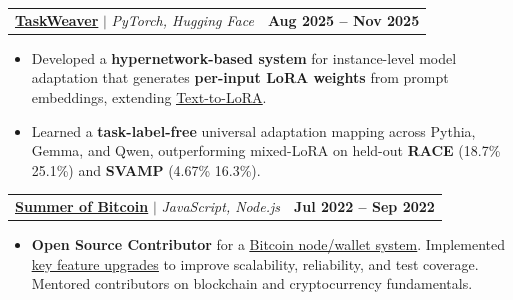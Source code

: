 \documentclass[letterpaper,10pt]{article}
\makeatletter
\newcommand{\resumeBulletItem}[1]{
  \item\small{
    {#1 \vspace{-2pt}}
  }
}
\newcommand{\resumeProjectHeading}[2]{
    \item
    \begin{tabular*}{1.0001\textwidth}{l@{\extracolsep{\fill}}r}
      \small#1 & \textbf{\small #2}\\
    \end{tabular*}\vspace{-7pt}
}
\newcommand{\resumeItemListStart}{\begin{itemize}}
\newcommand{\resumeItemListEnd}{\end{itemize}\vspace{-5pt}}
\makeatother
\begin{document}
    \vspace{-12pt}

    \resumeProjectHeading
    {\textbf{\href{https://github.com/RajWorking/taskweaver}{TaskWeaver}} $|$ \emph{PyTorch, Hugging Face}}{Aug 2025 -- Nov 2025}
        \resumeItemListStart
            \resumeBulletItem{
                Developed a \textbf{hypernetwork-based system} for instance-level model adaptation that generates \textbf{per-input LoRA weights} from prompt embeddings, extending \href{https://github.com/SakanaAI/text-to-lora}{\underline{Text-to-LoRA}}.
            }
            \resumeBulletItem{
                Learned a \textbf{task-label-free} universal adaptation mapping across Pythia, Gemma, and Qwen, outperforming mixed-LoRA on held-out \textbf{RACE} (18.7\% \textrightarrow{} 25.1\%) and \textbf{SVAMP} (4.67\% \textrightarrow{} 16.3\%).
            }
        \resumeItemListEnd
    


    \vspace{-12pt}

   \resumeProjectHeading
    {\textbf{\href{https://summerofbitcoin.org/}{Summer of Bitcoin}} $|$ \emph{JavaScript, Node.js}}{Jul 2022 -- Sep 2022}
    \resumeItemListStart
        \resumeBulletItem{
            \textbf{Open Source Contributor} for a \href{https://bcoin.io/}{\underline{Bitcoin node/wallet system}}. Implemented \href{https://bitcoinops.org/en/topics/taproot/}{\underline{key feature upgrades}} to improve scalability, reliability, and test coverage. Mentored contributors on blockchain and cryptocurrency fundamentals.
        }
    \resumeItemListEnd


    
\end{document}
